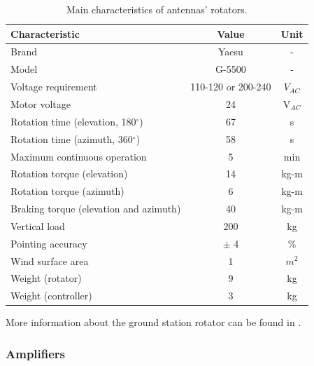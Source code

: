 \begin{table}[ht]
    \centering
    \begin{tabular}{lcc}
        \toprule[1.5pt]
        \textbf{Characteristic}                     & \textbf{Value}        & \textbf{Unit} \\
        \midrule
        Brand                                       & Yaesu                 & - \\
        Model                                       & G-5500                & - \\
        Voltage requirement                         & 110-120 or 200-240    & $V_{AC}$ \\
        Motor voltage                               & 24                    & V$_{AC}$ \\
        Rotation time (elevation, 180$^{\circ}$)    & 67                    & s \\
        Rotation time (azimuth, 360$^{\circ}$)      & 58                    & s \\
        Maximum continuous operation                & 5                     & min \\
        Rotation torque (elevation)                 & 14                    & kg-m \\
        Rotation torque (azimuth)                   & 6                     & kg-m \\
        Braking torque (elevation and azimuth)      & 40                    & kg-m \\
        Vertical load                               & 200                   & kg \\
        Pointing accuracy                           & $\pm$ 4               & \% \\
        Wind surface area                           & 1                     & $m^{2}$ \\
        Weight (rotator)                            & 9                     & kg \\
        Weight (controller)                         & 3                     & kg \\
        \bottomrule[1.5pt]
    \end{tabular}
    \caption{Main characteristics of antennas' rotators.}
    \label{tab:grs-rotor}
\end{table}

More information about the ground station rotator can be found in \cite{g5500}.

\subsubsection{Amplifiers}

